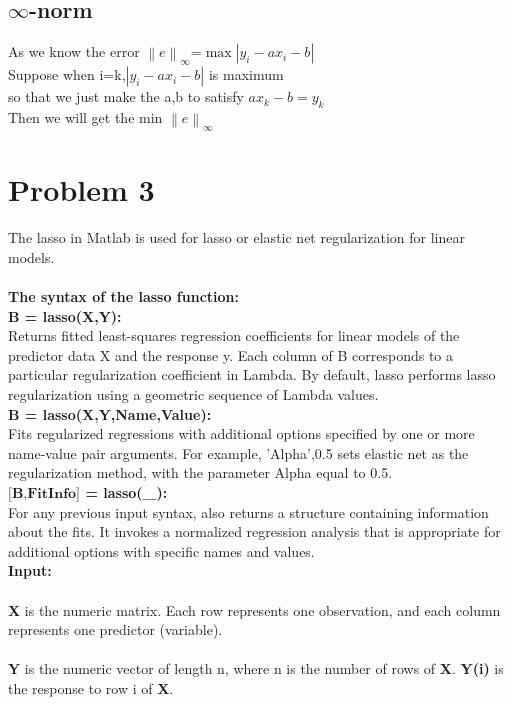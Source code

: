 \documentclass[12pt,a4paper]{article}
\begin{document}
\subsection{$\infty$-norm}
As we know the error $\left\|e\right\|_\infty$=$\max{|y_i-ax_i-b|}$\\
Suppose when i=k,$|y_i-ax_i-b|$ is maximum\\
so that we just make the a,b to satisfy $ax_k-b=y_k$ \\
Then we will get the min $\left\|e\right\|_\infty$\\


\newpage

\section{Problem 3}
The lasso in Matlab is used for lasso or elastic net regularization for linear models. \\\\
\textbf{The syntax of the lasso function:}\\

\noindent \textbf{B = lasso(X,Y):}\\
Returns fitted least-squares regression coefficients for linear models of the predictor data X and the response y. Each column of B corresponds to a particular regularization coefficient in Lambda. By default, lasso performs lasso regularization using a geometric sequence of Lambda values.\\

\noindent \textbf{B = lasso(X,Y,Name,Value):}\\
Fits regularized regressions with additional options specified by one or more name-value pair arguments. For example, 'Alpha',0.5 sets elastic net as the regularization method, with the parameter Alpha equal to 0.5.\\

\noindent \textbf{$\textbf{[B,FitInfo]}$ = lasso($\_\_\_$):}\\
For any previous input syntax, also returns a structure containing information about the fits. It invokes a normalized regression analysis that is appropriate for additional options with specific names and values.\\

\noindent \textbf{Input: }\\\\
\textbf{X} is the numeric matrix. Each row represents one observation, and each column represents one predictor (variable).\\\\
\textbf{Y} is the numeric vector of length n, where n is the number of rows of \textbf{X}. \textbf{Y(i)} is the response to row i of \textbf{X}.\\
\end{document}
